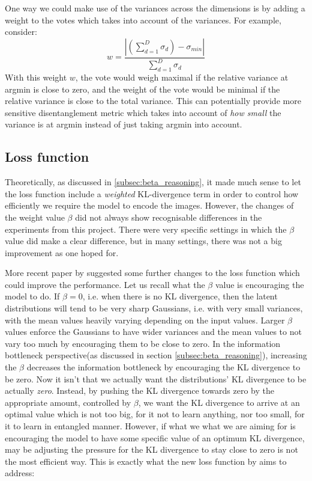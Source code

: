             One way we could make use of the variances across the dimensions is by adding a weight to the votes which takes into account of the variances. For example, consider:
               \[w = \frac{\left|\left(\sum_{d=1}^D \sigma_d \right) - \sigma_{min}\right|}{\sum_{d=1}^D \sigma_d}\]
            With this weight $w$, the vote would weigh maximal if the relative variance at argmin is close to zero, and the weight of the vote would be minimal if the relative variance is close to the total variance. This can potentially provide more sensitive disentanglement metric which takes into account of \textit{how small} the variance is at argmin instead of just taking argmin into account.
            
        \subsection{Loss function}
            Theoretically, as discussed in \ref{subsec:beta_reasoning}, it made much sense to let the loss function include a \textit{weighted} KL-divergence term in order to control how efficiently we require the model to encode the images. However, the changes of the weight value $\beta$ did not always show recognisable differences in the experiments from this project. There were very specific settings in which the $\beta$ value did make a clear difference, but in many settings, there was not a big improvement as one hoped for.
            
            More recent paper by \cite{burgess2018understanding} suggested some further changes to the loss function which could improve the performance. Let us recall what the $\beta$ value is encouraging the model to do. If $\beta=0$, i.e. when there is no KL divergence, then the latent distributions will tend to be very sharp Gaussians, i.e. with very small variances, with the mean values heavily varying depending on the input values. Larger $\beta$ values enforce the Gaussians to have wider variances and the mean values to not vary too much by encouraging them to be close to zero. In the information bottleneck perspective(as discussed in section \ref{subsec:beta_reasoning}), increasing the $\beta$ decreases the information bottleneck by encouraging the KL divergence to be zero. Now it isn't that we actually want the distributions' KL divergence to be actually \textit{zero}. Instead, by pushing the KL divergence towards zero by the appropriate amount, controlled by $\beta$, we want the KL divergence to arrive at an optimal value which is not too big, for it not to learn anything, nor too small, for it to learn in entangled manner. However, if what we what we are aiming for is encouraging the model to have some specific value of an optimum KL divergence, may be adjusting the pressure for the KL divergence to stay close to zero is not the most efficient way. This is exactly what the new loss function by \cite{burgess2018understanding} aims to address:
            
